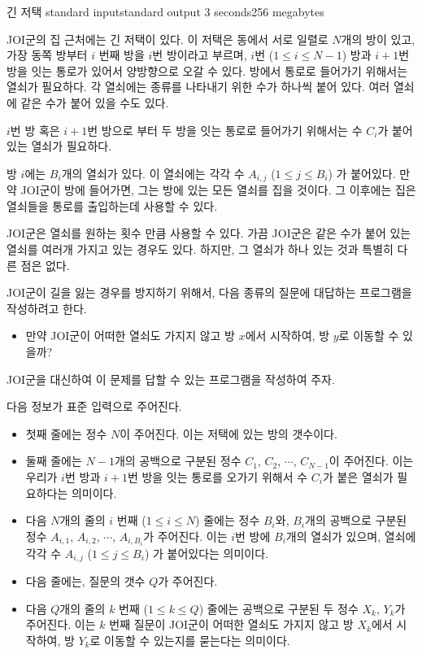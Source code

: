 \begin{problem}{긴 저택}
	{standard input}{standard output}
	{3 seconds}{256 megabytes}{}
	
	JOI군의 집 근처에는 긴 저택이 있다. 이 저택은 동에서 서로 일렬로 $N$개의 방이 있고, 가장 동쪽 방부터 $i$ 번째 방을 $i$번 방이라고 부르며, $i$번 ($1 \le i \le N-1$) 방과 $i+1$번 방을 잇는 통로가 있어서 양방향으로 오갈 수 있다. 방에서 통로로 들어가기 위해서는 열쇠가 필요하다. 각 열쇠에는 종류를 나타내기 위한 수가 하나씩 붙어 있다. 여러 열쇠에 같은 수가 붙어 있을 수도 있다.
	
	$i$번 방 혹은 $i+1$번 방으로 부터 두 방을 잇는 통로로 들어가기 위해서는 수 $C_i$가 붙어 있는 열쇠가 필요하다.
	
	방 $i$에는 $B_i$개의 열쇠가 있다. 이 열쇠에는 각각 수 $A_{i, j}$ ($1 \le j \le B_i$) 가 붙어있다. 만약 JOI군이 방에 들어가면, 그는 방에 있는 모든 열쇠를 집을 것이다. 그 이후에는 집은 열쇠들을 통로를 출입하는데 사용할 수 있다.
	
	JOI군은 열쇠를 원하는 횟수 만큼 사용할 수 있다. 가끔 JOI군은 같은 수가 붙어 있는 열쇠를 여러개 가지고 있는 경우도 있다. 하지만, 그 열쇠가 하나 있는 것과 특별히 다른 점은 없다.
	
	JOI군이 길을 잃는 경우를 방지하기 위해서, 다음 종류의 질문에 대답하는 프로그램을 작성하려고 한다.
	
	\begin{itemize}
		\item 만약 JOI군이 어떠한 열쇠도 가지지 않고 방 $x$에서 시작하여, 방 $y$로 이동할 수 있을까?
	\end{itemize}

	JOI군을 대신하여 이 문제를 답할 수 있는 프로그램을 작성하여 주자.
	
	\InputFile
	
	다음 정보가 표준 입력으로 주어진다.
	
	\begin{itemize}
		\item 첫째 줄에는 정수 $N$이 주어진다. 이는 저택에 있는 방의 갯수이다.
		\item 둘째 줄에는 $N-1$개의 공백으로 구분된 정수 $C_1$, $C_2$, $\cdots$, $C_{N-1}$이 주어진다. 이는 우리가 $i$번 방과 $i+1$번 방을 잇는 통로를 오가기 위해서 수 $C_i$가 붙은 열쇠가 필요하다는 의미이다.
		\item 다음 $N$개의 줄의 $i$ 번째 ($1 \le i \le N$) 줄에는 정수 $B_i$와, $B_i$개의 공백으로 구분된 정수 $A_{i, 1}$, $A_{i, 2}$, $\cdots$, $A_{i, B_i}$가 주어진다. 이는 $i$번 방에 $B_i$개의 열쇠가 있으며, 열쇠에 각각 수 $A_{i, j}$ ($1 \le j \le B_i$) 가 붙어있다는 의미이다.
		\item 다음 줄에는, 질문의 갯수 $Q$가 주어진다.
		\item 다음 $Q$개의 줄의 $k$ 번째 ($1 \le k \le Q$) 줄에는 공백으로 구분된 두 정수 $X_k$, $Y_k$가 주어진다. 이는 $k$ 번째 질문이 JOI군이 어떠한 열쇠도 가지지 않고 방 $X_k$에서 시작하여, 방 $Y_k$로 이동할 수 있는지를 묻는다는 의미이다.
	\end{itemize}
	

\end{problem}
